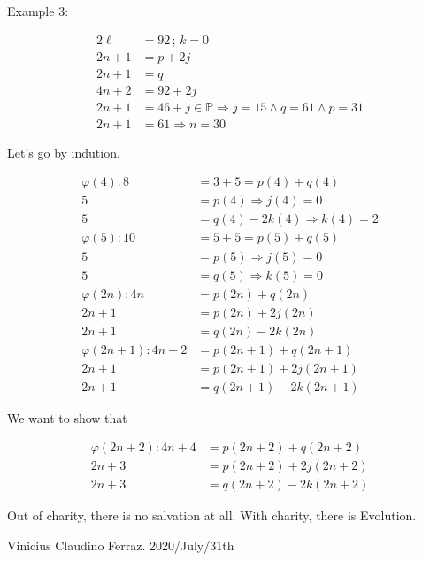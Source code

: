 \documentclass[12pt]{article}
\begin{document}
Example 3: 

\begin{align}
  2\ell &= 92\,;\,k = 0 \\
  2n + 1 &= p + 2j \\
  2n + 1 &= q \\
  4n + 2 &= 92 + 2j \\
  2n + 1 &= 46 + j \in \mathbb{P} \Rightarrow j = 15 \wedge q = 61 \wedge p = 31 \\
  2n + 1 &= 61 \Rightarrow n = 30 
\end{align}

Let's go by indution.

\begin{align}
\varphi(4): 8 &= 3 + 5 = p(4) + q(4) \\
5 &= p(4) \Rightarrow j(4) = 0 \\
5 &= q(4) - 2k(4) \Rightarrow k(4) = 2 \\
\varphi(5): 10 &= 5 + 5 = p(5) + q(5) \\
5 &= p(5) \Rightarrow j(5) = 0 \\
5 &= q(5) \Rightarrow k(5) = 0 \\
\varphi(2n): 4n &= p(2n) + q(2n) \\
2n + 1 &= p(2n) + 2j(2n) \\
2n + 1 &= q(2n) - 2k(2n) \\
\varphi(2n + 1): 4n + 2 &= p(2n + 1) + q(2n + 1) \\
2n + 1 &= p(2n + 1) + 2j(2n + 1) \\
2n + 1 &= q(2n + 1) - 2k(2n + 1)
\end{align}

We want to show that

\begin{align}
\varphi(2n + 2): 4n + 4 &= p(2n + 2) + q(2n + 2) \\
2n + 3 &= p(2n + 2) + 2j(2n + 2) \\
2n + 3 &= q(2n + 2) - 2k(2n + 2)
\end{align}


\vspace{6mm}

Out of charity, there is no salvation at all. With charity, there is Evolution.

Vinicius Claudino Ferraz. 2020/July/31th
\end{document}

